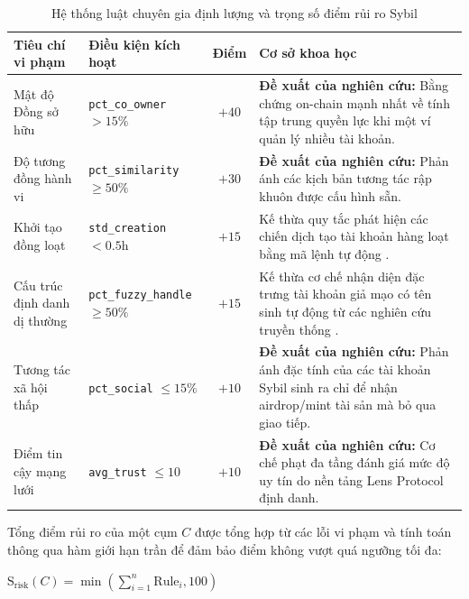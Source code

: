 \begin{table}[H]
    \centering
    \caption{Hệ thống luật chuyên gia định lượng và trọng số điểm rủi ro Sybil}
    \label{tab:heuristics}
    \renewcommand{\arraystretch}{1.4}
    \setlength{\tabcolsep}{6pt}
    \begin{tabular}{|p{3cm}|p{3.5cm}|c|p{6.4cm}|}
        \hline
        \textbf{Tiêu chí vi phạm} & \textbf{Điều kiện kích hoạt} & \textbf{Điểm} & \textbf{Cơ sở khoa học} \\
        \hline
        Mật độ Đồng sở hữu & \texttt{pct\_co\_owner} $> 15\%$ & $+40$ & \textbf{Đề xuất của nghiên cứu:} Bằng chứng on-chain mạnh nhất về tính tập trung quyền lực khi một ví quản lý nhiều tài khoản. \\
        \hline
        Độ tương đồng hành vi & \texttt{pct\_similarity} $\geq 50\%$ & $+30$ & \textbf{Đề xuất của nghiên cứu:} Phản ánh các kịch bản tương tác rập khuôn được cấu hình sẵn. \\
        \hline
        Khởi tạo đồng loạt & \texttt{std\_creation} $< 0.5$h & $+15$ & Kế thừa quy tắc phát hiện các chiến dịch tạo tài khoản hàng loạt bằng mã lệnh tự động \cite{al2017sybil}. \\
        \hline
        Cấu trúc định danh dị thường & \texttt{pct\_fuzzy\_handle} $\geq 50\%$ & $+15$ & Kế thừa cơ chế nhận diện đặc trưng tài khoản giả mạo có tên sinh tự động từ các nghiên cứu truyền thống \cite{al2017sybil}. \\
        \hline
        Tương tác xã hội thấp & \texttt{pct\_social} $\leq 15\%$ & $+10$ & \textbf{Đề xuất của nghiên cứu:} Phản ánh đặc tính của các tài khoản Sybil sinh ra chỉ để nhận airdrop/mint tài sản mà bỏ qua giao tiếp. \\
        \hline
        Điểm tin cậy mạng lưới & \texttt{avg\_trust} $\leq 10$ & $+10$ & \textbf{Đề xuất của nghiên cứu:} Cơ chế phạt đa tầng đánh giá mức độ uy tín do nền tảng Lens Protocol định danh. \\
        \hline
    \end{tabular}
\end{table}

Tổng điểm rủi ro của một cụm $C$ được tổng hợp từ các lỗi vi phạm và tính toán thông qua hàm giới hạn trần để đảm bảo điểm không vượt quá ngưỡng tối đa:\vspace{0.2cm}

\begin{center}
\(
    \text{S}_{\text{risk}}(C) = \min \left( \sum_{i=1}^{n} \text{Rule}_i, 100 \right)
\)
\end{center}\vspace{0.3cm}


